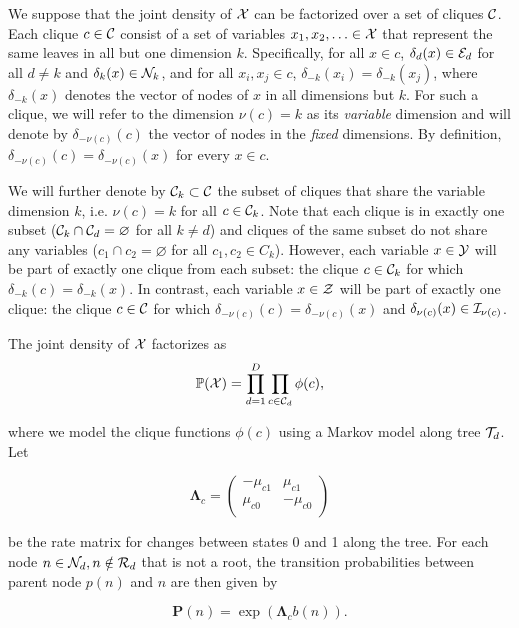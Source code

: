 \documentclass[a4paper,12pt]{article}
\def\P{\mathbb{P}}
\def\E{\mathbb{E}}
\def\bLambda{\boldsymbol{\Lambda}}
\def\bP{\boldsymbol{P}}
\def\C{{\cal C}}
\def\E{{\cal E}}
\def\I{{\cal I}}
\def\N{{\cal N}}
\def\R{{\cal R}}
\def\T{{\cal T}}
\def\X{{\cal X}}
\def\Y{{\cal Y}}
\def\Z{{\cal Z}}
\begin{document}
We suppose that the joint density of $\X$ can be factorized over a set of cliques $\C$. Each clique $c \in \C$ consist of a set of variables $x_1, x_2, \ldots \in \X$ that represent the same leaves in all but one dimension $k$. Specifically, for all $x \in c$, $\delta_d(x) \in \E_d$ for all $d \neq k$ and $\delta_k(x) \in \N_k$, and for all $x_i, x_j \in c$, $\delta_{-k}(x_i) = \delta_{-k}(x_j)$, where $\delta_{-k}(x)$ denotes the vector of nodes of $x$ in all dimensions but $k$. For such a clique, we will refer to the dimension $\nu(c) = k$ as its \emph{variable} dimension and will denote by $\delta_{-\nu(c)}(c)$ the vector of nodes in the \emph{fixed} dimensions. By definition, $\delta_{-\nu(c)}(c)=\delta_{-\nu(c)}(x)$ for every $x \in c$.

We will further denote by $\C_k \subset \C$ the subset of cliques that share the variable dimension $k$, i.e. $\nu(c)=k$ for all $c \in \C_k$. Note that each clique is in exactly one subset ($\C_k \cap \C_d = \varnothing$ for all $k \neq d$) and cliques of the same subset do not share any variables ($c_1 \cap c_2 = \varnothing$ for all $c_1, c_2 \in C_k$). However, each variable $x \in \Y$ will be part of exactly one clique from each subset: the clique $c \in \C_k$ for which $\delta_{-k}(c) = \delta_{-k}(x)$. In contrast, each variable $x \in \Z$ will be part of exactly one clique: the clique $c \in \C$ for which $\delta_{-\nu(c)}(c) = \delta_{-\nu(c)}(x)$ and $\delta_{\nu(c)}(x) \in \I_{\nu(c)}$.

The joint density of $\X$ factorizes as
\begin{equation*}
 \P(\X) = \prod_{d=1}^D \prod_{c \in \C_d} \phi(c),
\end{equation*}

where
we model the clique functions $\phi(c)$ using a Markov model along tree $\T_d$. Let

\begin{equation*}
\bLambda_c =
 \begin{pmatrix}
  -\mu_{c1} & \mu_{c1}\\
  \mu_{c0} & -\mu_{c0}\\
 \end{pmatrix}
\end{equation*}

be the rate matrix for changes between states 0 and 1 along the tree. For each node $n \in \N_d, n \notin \R_d$ that is not a root, the transition probabilities between parent node $p(n)$ and $n$ are then given by

\begin{equation*}
 \bP(n) = \exp(\bLambda_c b(n)).
\end{equation*}
\end{document}
